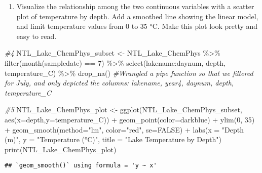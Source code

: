 \documentclass[
]{article}
\newenvironment{Shaded}{\begin{snugshade}}{\end{snugshade}}
\newcommand{\AttributeTok}[1]{\textcolor[rgb]{0.77,0.63,0.00}{#1}}
\newcommand{\CommentTok}[1]{\textcolor[rgb]{0.56,0.35,0.01}{\textit{#1}}}
\newcommand{\ConstantTok}[1]{\textcolor[rgb]{0.00,0.00,0.00}{#1}}
\newcommand{\DecValTok}[1]{\textcolor[rgb]{0.00,0.00,0.81}{#1}}
\newcommand{\FunctionTok}[1]{\textcolor[rgb]{0.00,0.00,0.00}{#1}}
\newcommand{\NormalTok}[1]{#1}
\newcommand{\OtherTok}[1]{\textcolor[rgb]{0.56,0.35,0.01}{#1}}
\newcommand{\SpecialCharTok}[1]{\textcolor[rgb]{0.00,0.00,0.00}{#1}}
\newcommand{\StringTok}[1]{\textcolor[rgb]{0.31,0.60,0.02}{#1}}
\providecommand{\tightlist}{%
  \setlength{\itemsep}{0pt}\setlength{\parskip}{0pt}}
\begin{document}
\begin{enumerate}
\def\labelenumi{\arabic{enumi}.}
\setcounter{enumi}{4}
\tightlist
\item
  Visualize the relationship among the two continuous variables with a
  scatter plot of temperature by depth. Add a smoothed line showing the
  linear model, and limit temperature values from 0 to 35 °C. Make this
  plot look pretty and easy to read.
\end{enumerate}

\begin{Shaded}
\begin{Highlighting}[]
\CommentTok{\#4}
\NormalTok{NTL\_Lake\_ChemPhys\_subset }\OtherTok{\textless{}{-}}
\NormalTok{  NTL\_Lake\_ChemPhys }\SpecialCharTok{\%\textgreater{}\%}
  \FunctionTok{filter}\NormalTok{(}\FunctionTok{month}\NormalTok{(sampledate) }\SpecialCharTok{==} \DecValTok{7}\NormalTok{) }\SpecialCharTok{\%\textgreater{}\%}
  \FunctionTok{select}\NormalTok{(lakename}\SpecialCharTok{:}\NormalTok{daynum, depth, temperature\_C) }\SpecialCharTok{\%\textgreater{}\%}
  \FunctionTok{drop\_na}\NormalTok{()}
\CommentTok{\#Wrangled a pipe function so that we filtered for July, and only depicted the columns: lakename, year4, daynum, depth, temperature\_C}

\CommentTok{\#5}
\NormalTok{NTL\_Lake\_ChemPhys\_plot }\OtherTok{\textless{}{-}}
\FunctionTok{ggplot}\NormalTok{(NTL\_Lake\_ChemPhys\_subset, }\FunctionTok{aes}\NormalTok{(}\AttributeTok{x=}\NormalTok{depth,}\AttributeTok{y=}\NormalTok{temperature\_C)) }\SpecialCharTok{+}
  \FunctionTok{geom\_point}\NormalTok{(}\AttributeTok{color=}\StringTok{\textquotesingle{}darkblue\textquotesingle{}}\NormalTok{) }\SpecialCharTok{+}
  \FunctionTok{ylim}\NormalTok{(}\DecValTok{0}\NormalTok{, }\DecValTok{35}\NormalTok{) }\SpecialCharTok{+} 
  \FunctionTok{geom\_smooth}\NormalTok{(}\AttributeTok{method=}\StringTok{"lm"}\NormalTok{, }\AttributeTok{color=}\StringTok{"red"}\NormalTok{, }\AttributeTok{se=}\ConstantTok{FALSE}\NormalTok{) }\SpecialCharTok{+}
  \FunctionTok{labs}\NormalTok{(}\AttributeTok{x =} \StringTok{"Depth (m)"}\NormalTok{, }
       \AttributeTok{y =} \StringTok{"Temperature (°C)"}\NormalTok{,}
    \AttributeTok{title =} \StringTok{"Lake Temperature by Depth"}\NormalTok{)}
\FunctionTok{print}\NormalTok{(NTL\_Lake\_ChemPhys\_plot) }
\end{Highlighting}
\end{Shaded}

\begin{verbatim}
## `geom_smooth()` using formula = 'y ~ x'
\end{verbatim}
\end{document}
